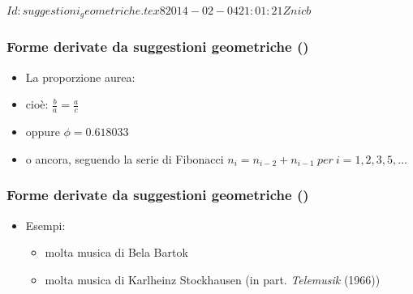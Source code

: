 %
%
\svnInfo $Id: suggestioni_geometriche.tex 8 2014-02-04 21:01:21Z nicb $

\setcounter{ms}{0}
\begin{frame}
    \frametitle{Forme derivate da suggestioni geometriche ()}

    \begin{itemize}

        \item La proporzione aurea:

            \begin{center}
            \end{center}

        \item  cio\`e: $\frac{b}{a} = \frac{a}{c}$

        \item  oppure $\phi = 0.618033$

        \item o ancora, seguendo la serie di Fibonacci
               $n_i = n_{i-2} + n_{i-1}~per~i = 1,2,3,5,\dots$

    \end{itemize}

\end{frame}

\begin{frame}
    \frametitle{Forme derivate da suggestioni geometriche ()}

    \begin{itemize}

        \item Esempi:

            \begin{itemize}

                \item molta musica di Bela Bartok

                \item molta musica di Karlheinz Stockhausen
                    (in part. \emph{Telemusik} (1966))

            \end{itemize}

    \end{itemize}

\end{frame}

